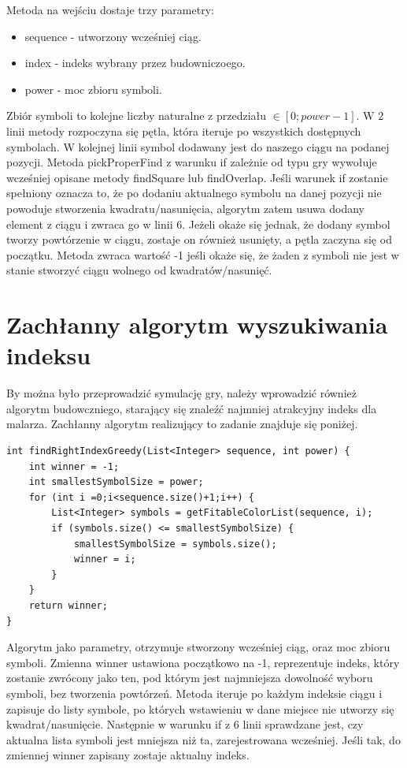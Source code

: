 \documentclass[document]{xmgr}
\begin{document}
Metoda na wejściu dostaje trzy parametry:
\begin{itemize}
\item sequence - utworzony wcześniej ciąg.
\item index - indeks wybrany przez budowniczoego.
\item power - moc zbioru symboli.
\end{itemize}
Zbiór symboli to kolejne liczby naturalne z przedziału  $\in [0; power-1]$. W 2 linii metody rozpoczyna się pętla, która iteruje po wszystkich dostępnych symbolach. W kolejnej linii symbol dodawany jest do naszego ciągu na podanej pozycji. Metoda pickProperFind z warunku if zależnie od typu gry wywołuje wcześniej opisane metody findSquare lub findOverlap. Jeśli warunek if zostanie spełniony oznacza to, że po dodaniu aktualnego symbolu na danej pozycji nie powoduje stworzenia kwadratu/nasunięcia, algorytm zatem usuwa dodany element z ciągu i zwraca go w linii 6. Jeżeli  okaże się jednak, że dodany symbol tworzy powtórzenie w ciągu, zostaje on również usunięty, a pętla zaczyna się od początku. Metoda zwraca wartość -1 jeśli okaże się, że żaden z symboli nie jest w stanie stworzyć ciągu wolnego od kwadratów/nasunięć.

\section{Zachłanny algorytm wyszukiwania indeksu}
By można było przeprowadzić symulację gry, należy wprowadzić również algorytm budowczniego, starający się znaleźć najmniej atrakcyjny indeks dla malarza. Zachłanny algorytm realizujący to zadanie znajduje się poniżej.

\begin{lstlisting}[frame=single]
int findRightIndexGreedy(List<Integer> sequence, int power) {
	int winner = -1;
	int smallestSymbolSize = power;
	for (int i =0;i<sequence.size()+1;i++) {
		List<Integer> symbols = getFitableColorList(sequence, i);
		if (symbols.size() <= smallestSymbolSize) {
			smallestSymbolSize = symbols.size();
			winner = i;
		}
	}
	return winner;
}
\end{lstlisting}

Algorytm jako parametry, otrzymuje stworzony wcześniej ciąg, oraz moc zbioru symboli. Zmienna winner ustawiona początkowo na -1, reprezentuje indeks, który zostanie zwrócony jako ten, pod którym jest najmniejsza dowolność wyboru symboli, bez tworzenia powtórzeń. Metoda iteruje po każdym indeksie ciągu i zapisuje do listy symbole, po których wstawieniu w dane miejsce nie utworzy się kwadrat/nasunięcie. Następnie w warunku if z 6 linii sprawdzane jest, czy aktualna lista symboli jest mniejsza niż ta, zarejestrowana wcześniej. Jeśli tak, do zmiennej winner zapisany zostaje aktualny indeks.
\end{document}

